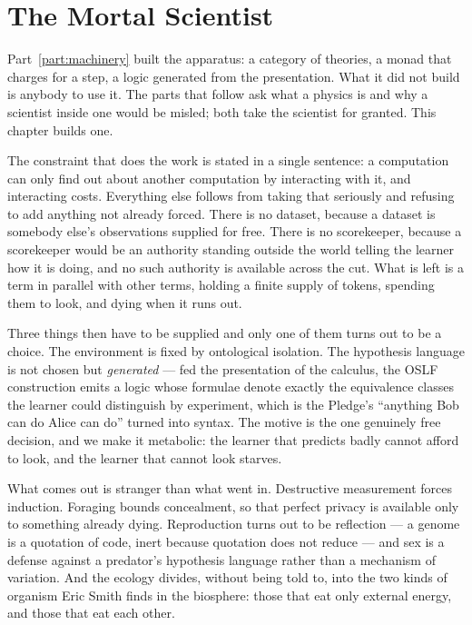 \chapter{The Mortal Scientist}
\label{ch:sci}

\noindent
Part~\ref{part:machinery} built the apparatus: a category of theories, a monad
that charges for a step, a logic generated from the presentation. What it did not
build is anybody to use it. The parts that follow ask what a physics is and why a
scientist inside one would be misled; both take the scientist for granted. This
chapter builds one.

The constraint that does the work is stated in a single sentence: a
computation can only find out about another computation by interacting with
it, and interacting costs. Everything else follows from taking that
seriously and refusing to add anything not already forced. There is no
dataset, because a dataset is somebody else's observations supplied for
free. There is no scorekeeper, because a scorekeeper would be an authority
standing outside the world telling the learner how it is doing, and no such
authority is available across the cut. What is left is a term in parallel
with other terms, holding a finite supply of tokens, spending them to look,
and dying when it runs out.

Three things then have to be supplied and only one of them turns out to be a
choice. The environment is fixed by ontological isolation. The hypothesis
language is not chosen but \emph{generated} --- fed the presentation of the
calculus, the OSLF construction emits a logic whose formulae denote exactly
the equivalence classes the learner could distinguish by experiment, which is
the Pledge's ``anything Bob can do Alice can do'' turned into syntax. The
motive is the one genuinely free decision, and we make it metabolic: the
learner that predicts badly cannot afford to look, and the learner that
cannot look starves.

What comes out is stranger than what went in. Destructive measurement forces
induction. Foraging bounds concealment, so that perfect privacy is available
only to something already dying. Reproduction turns out to be reflection ---
a genome is a quotation of code, inert because quotation does not reduce ---
and sex is a defense against a predator's hypothesis language rather than a
mechanism of variation. And the ecology divides, without being told to, into
the two kinds of organism Eric Smith finds in the biosphere: those that eat
only external energy, and those that eat each other.


